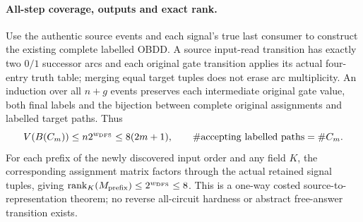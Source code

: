 \documentclass[11pt]{article}
\begin{document}
\paragraph{All-step coverage, outputs and exact rank.}
Use the authentic source events and each signal's true last consumer
to construct the existing complete labelled OBDD. A source
input-read transition has exactly two $0/1$ successor arcs and
each original gate transition applies its actual four-entry truth
table; merging equal target tuples does not erase arc multiplicity.
An induction over all $n+g$ events preserves each intermediate
original gate value, both final labels and the bijection between
complete original assignments and labelled target paths. Thus
\[
V(B(C_m))\leq n2^{w_{\rm DFS}}\leq8(2m+1),\qquad
\#\mathrm{accepting\ labelled\ paths}=\#C_m.
\]
For each prefix of the newly discovered input order and any field
$K$, the corresponding assignment matrix factors through the
actual retained signal tuples, giving
$\mathrm{rank}_K(M_{\rm prefix})\leq2^{w_{\rm DFS}}\leq8$.
This is a one-way costed source-to-representation theorem; no
reverse all-circuit hardness or abstract free-answer transition exists.
\end{document}
